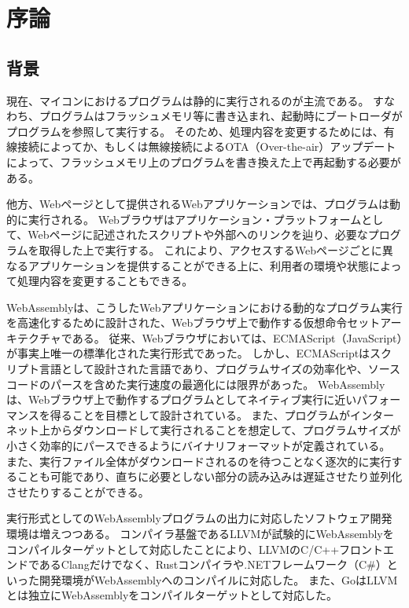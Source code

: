 \chapter{序論}
\label{chap:introduction}

\section{背景}
\label{section:background}

現在、マイコンにおけるプログラムは静的に実行されるのが主流である。
すなわち、プログラムはフラッシュメモリ等に書き込まれ、起動時にブートローダがプログラムを参照して実行する。
そのため、処理内容を変更するためには、有線接続によってか、もしくは無線接続によるOTA（Over-the-air）アップデートによって、フラッシュメモリ上のプログラムを書き換えた上で再起動する必要がある。

他方、Webページとして提供されるWebアプリケーションでは、プログラムは動的に実行される。
Webブラウザはアプリケーション・プラットフォームとして、Webページに記述されたスクリプトや外部へのリンクを辿り、必要なプログラムを取得した上で実行する。
これにより、アクセスするWebページごとに異なるアプリケーションを提供することができる上に、利用者の環境や状態によって処理内容を変更することもできる。


WebAssemblyは、こうしたWebアプリケーションにおける動的なプログラム実行を高速化するために設計された、Webブラウザ上で動作する仮想命令セットアーキテクチャである。
従来、Webブラウザにおいては、ECMAScript（JavaScript）が事実上唯一の標準化された実行形式であった。
しかし、ECMAScriptはスクリプト言語として設計された言語であり\cite{ecma2018}、プログラムサイズの効率化や、ソースコードのパースを含めた実行速度の最適化には限界があった。
WebAssemblyは、Webブラウザ上で動作するプログラムとしてネイティブ実行に近いパフォーマンスを得ることを目標として設計されている。
また、プログラムがインターネット上からダウンロードして実行されることを想定して、プログラムサイズが小さく効率的にパースできるようにバイナリフォーマットが定義されている。
また、実行ファイル全体がダウンロードされるのを待つことなく逐次的に実行することも可能であり、直ちに必要としない部分の読み込みは遅延させたり並列化させたりすることができる。

実行形式としてのWebAssemblyプログラムの出力に対応したソフトウェア開発環境は増えつつある。
コンパイラ基盤であるLLVMが試験的にWebAssemblyをコンパイルターゲットとして対応したことにより、LLVMのC/C++フロントエンドであるClangだけでなく、Rustコンパイラ\cite{rust_wasm}や.NETフレームワーク（C\#）\cite{mono_wasm}といった開発環境がWebAssemblyへのコンパイルに対応した。
また、GoはLLVMとは独立にWebAssemblyをコンパイルターゲットとして対応した\cite{go_wasm}。

